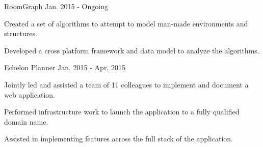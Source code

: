 

\begin{cventries}

  \vspace{1.5mm} %
  \cventry
    {RoomGraph} %
    {} %
    {} %
    {Jan. 2015 - Ongoing} %
    {
      \begin{cvitems} %
        \item {Created a set of algorithms to attempt to model man-made environments and structures.}
        \item {Developed a cross platform framework and data model to analyze the algorithms.}
        \\
      \end{cvitems}
    }
    
  \cventry
    {Echelon Planner} %
    {} %
    {} %
    {Jan. 2015 - Apr. 2015} %
    {
      \begin{cvitems} %
        \item {Jointly led and assisted a team of 11 colleagues to implement and document a web application.}
        \item {Performed infrastructure work to launch the application to a fully qualified domain name.}
        \item {Assisted in implementing features across the full stack of the application.}
        \\
      \end{cvitems}
    } 


\end{cventries}
